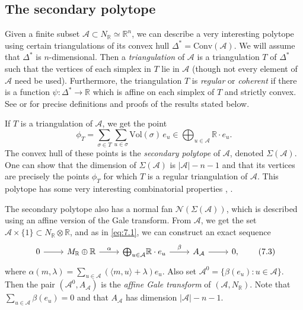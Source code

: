 \documentclass{amsart}
\theoremstyle{plain}
\theoremstyle{definition}
\begin{document}
	\subsection{The secondary polytope} Given a finite
subset $\mathcal{A} \subset N_\mathbb{R} \simeq \mathbb{R}^n$, we can describe
a very interesting polytope using certain triangulations of its convex
hull $\Delta^* = \mathrm{Conv}(\mathcal{A})$.  We will assume that
$\Delta^*$ is $n$-dimensional.  Then a {\it triangulation\/} of
$\mathcal{A}$ is a triangulation $T$ of $\Delta^*$ such that the vertices
of each simplex in $T$ lie in $\mathcal{A}$ (though not every element of
$\mathcal{A}$ need be used).  Furthermore, the triangulation $T$ is {\it
regular\/} or {\it coherent\/} if there is a function $\psi : \Delta^*
\to \mathbb{R}$ which is affine on each simplex of $T$ and strictly
convex.  See \cite{GKZ1} or \cite{BFS} for precise definitions and
proofs of the results stated below.

	 If $T$ is a triangulation of $\mathcal{A}$, we get the point
\begin{equation}
\phi_T = \sum_{\sigma\in T}
\sum_{u\in\sigma}\mathrm{Vol}(\sigma)\,e_u \in
{\textstyle{\bigoplus_{u\in\mathcal{A}}}} \mathbb{R}\cdot e_u.
\tag{7.2}\label{eq:7.2}
\end{equation}
The convex hull of these points is the {\it secondary polytope\/} of
$\mathcal{A}$, denoted $\Sigma(\mathcal{A})$.  One can show that the dimension
of $\Sigma(\mathcal{A})$ is $|\mathcal{A}| -n-1$ and that its vertices are
precisely the points $\phi_T$ for which $T$ is a regular triangulation
of $\mathcal{A}$.  This polytope has some very interesting combinatorial
properties \cite{GKZ1}, \cite{Stu2}.

	The secondary polytope also has a normal fan
$\mathcal{N}(\Sigma(\mathcal{A}))$, which is described using an affine version
of the Gale transform.  From $\mathcal{A}$, we get the set
$\mathcal{A}\times\{1\} \subset N_\mathbb{R}\otimes\mathbb{R}$, and as in
\eqref{eq:7.1}, we can construct an exact sequence
\begin{equation}
\begin{tikzcd}
0 \arrow[r] & M_\mathbb{R}\oplus\mathbb{R} \arrow[r, "\alpha"] & {\bigoplus_{u \in \mathcal{A}}} \mathbb{R}\cdot e_u \arrow[r, "\beta"] & A_{\mathcal{A}} \arrow[r] & 0,
\end{tikzcd}
\tag{7.3}\label{eq:7.3}
\end{equation}
where $\alpha(m,\lambda) = \sum_{u\in \mathcal{A}} (\langle m,u\rangle +
\lambda)e_u$.  Also set $\mathcal{A}^0 = \{\beta(e_u) : u \in \mathcal{A}\}$.
Then the pair $(\mathcal{A}^0,A_{\mathcal{A}})$ is the {\it affine Gale
transform\/} of $(\mathcal{A},N_\mathbb{R})$.  Note that $\sum_{u\in\mathcal{A}}
\beta(e_u) = 0$ and that $A_{\mathcal{A}}$ has dimension $|\mathcal{A}|-n-1$.
\end{document}

